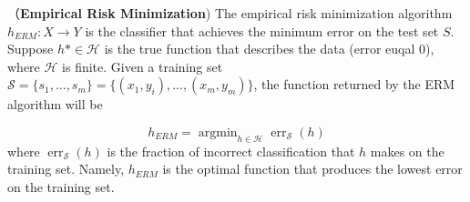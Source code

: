 \begin{definition}（\textbf{Empirical Risk Minimization})
The empirical risk minimization algorithm $h_{ERM} : X \rightarrow Y$ is the classifier that achieves the minimum error on the test set $S$. Suppose $h* \in \mathcal{H}$ is the true function that describes the data (error euqal $0$), where $\mathcal{H}$ is finite. Given a training set $\mathcal{S} = \{ s_{1},...,s_{m}\} = \{(x_{1},y_{i}),...,(x_{m},y_{m}) \}$, the function returned by the ERM algorithm will be

\begin{equation*}
    h_{ERM} = \operatorname{argmin}_{h \in \mathcal{H}} \operatorname{err}_{\mathcal{S}}(h)
\end{equation*}
where $\operatorname{err}_{\mathcal{S}}(h)$ is the fraction of incorrect classification that $h$ makes on the training set.
Namely, $h_{ERM}$ is the optimal function that produces the lowest error on the training set. 
\end{definition}
